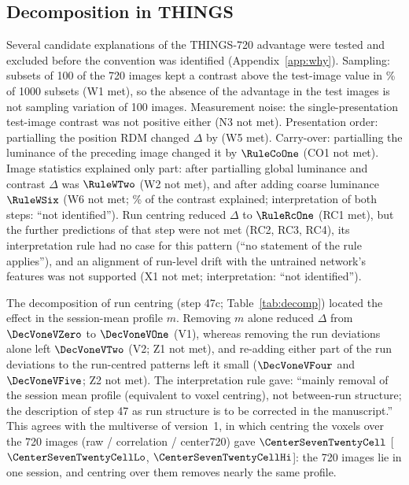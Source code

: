 \subsection{Decomposition in THINGS}
\label{sec:decomposition}
Several candidate explanations of the THINGS-720 advantage were tested and excluded before the
convention was identified (Appendix~\ref{app:why}). Sampling: subsets of 100 of the 720 images kept a
contrast above the test-image value in \RuleWOne\% of 1000 subsets (W1 met), so the absence of the
advantage in the test images is not sampling variation of 100 images. Measurement noise: the
single-presentation test-image contrast was not positive either (N3 not met). Presentation order:
partialling the position RDM changed $\Delta$ by \RuleWFive{} (W5 met). Carry-over: partialling the
luminance of the preceding image changed it by $\RuleCoOne$ (CO1 not met). Image statistics explained
only part: after partialling global luminance and contrast $\Delta$ was $\RuleWTwo$ (W2 not met), and
after adding coarse luminance $\RuleWSix$ (W6 not met; \RuleWSixFraction\% of the contrast explained;
interpretation of both steps: ``not identified''). Run centring reduced $\Delta$ to $\RuleRcOne$ (RC1
met), but the further predictions of that step were not met (RC2, RC3, RC4), its interpretation rule
had no case for this pattern (``no statement of the rule applies''), and an alignment of run-level drift
with the untrained network's features was not supported (X1 not met; interpretation: ``not identified'').

The decomposition of run centring (step 47c; Table~\ref{tab:decomp}) located the effect in the
session-mean profile $m$. Removing $m$ alone reduced $\Delta$ from $\DecVoneVZero$ to $\DecVoneVOne$
(V1), whereas removing the run deviations alone left $\DecVoneVTwo$ (V2; Z1 not met), and re-adding
either part of the run deviations to the run-centred patterns left it small ($\DecVoneVFour$ and
$\DecVoneVFive$; Z2 not met). The interpretation rule gave: ``mainly removal of the session mean profile
(equivalent to voxel centring), not between-run structure; the description of step 47 as run structure is
to be corrected in the manuscript.'' This agrees with the multiverse of version~1, in which centring the
voxels over the 720 images (raw / correlation / center720) gave $\CenterSevenTwentyCell$
[$\CenterSevenTwentyCellLo$, $\CenterSevenTwentyCellHi$]: the 720 images lie in one session, and
centring over them removes nearly the same profile.

